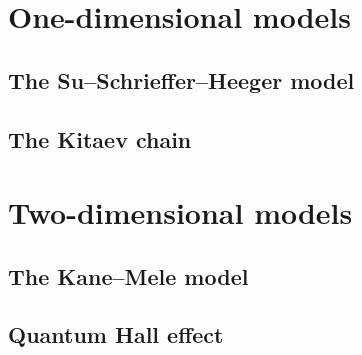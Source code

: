 \section{One-dimensional models}

\subsection{The Su--Schrieffer--Heeger model}

\subsection{The Kitaev chain}


\section{Two-dimensional models}

\subsection{The Kane--Mele model}

\subsection{Quantum Hall effect}